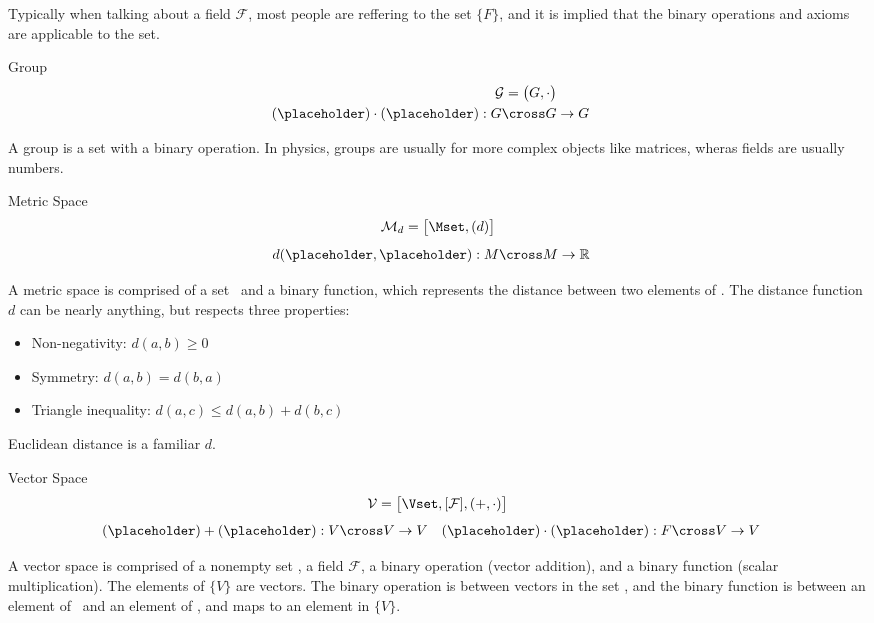 Typically when talking about a field \(\mathcal{F}\), most people are reffering to the set \(\{F\}\), and it is implied that the binary operations and axioms are applicable to the set. 
\begin{mathbox}{Group}
	\begin{align*}
		\mathcal{G}=\big(G,\cdot\big)
		\\
		(\placeholder)\cdot(\placeholder):G\cross G&\rightarrow G
	\end{align*}
\end{mathbox}
A group is a set with a binary operation. 
In physics, groups are usually for more complex objects like matrices, wheras fields are usually numbers. 
\newpage
\begin{mathbox}{Metric Space}
	\begin{equation*}
		\mathcal{M}_d=\big[\Mset, (d)\big]
	\end{equation*}
	\begin{align*}
	d(\placeholder,\placeholder):M\cross M&\rightarrow \mathbb{R}
	\end{align*}
\end{mathbox}
A metric space is comprised of a set \Xset\ and a binary function, which represents the distance between two elements of \Xset. The distance function \(d\) can be nearly anything, but respects three properties:
\begin{itemize}
	\item Non-negativity: \(d(a,b)\geq0\)
	\item Symmetry: \(d(a,b)=d(b,a)\)
	\item Triangle inequality: \(d(a,c)\leq d(a,b)+d(b,c)\)
\end{itemize}
Euclidean distance is a familiar \(d\).

\newpage
\begin{mathbox}{Vector Space}
	\begin{equation*}
		\mathcal{V}=\big[\Vset,[\mathcal{F}], (+,\cdot)\big]
	\end{equation*}
	\begin{align*}
	(\placeholder)+(\placeholder):V\cross V&\rightarrow V
	&
	(\placeholder)\cdot(\placeholder):F\cross V&\rightarrow V
	\end{align*}
\end{mathbox}
A vector space is comprised of a nonempty set \Vset, a field \(\mathcal{F}\), a binary operation (vector addition), and a binary function (scalar multiplication).
The elements of \(\{V\}\) are vectors. The binary operation is between vectors in the set \Vset, and the binary function is between an element of \Fset\ and an element of \Vset, and maps to an element in \(\{V\}\).

